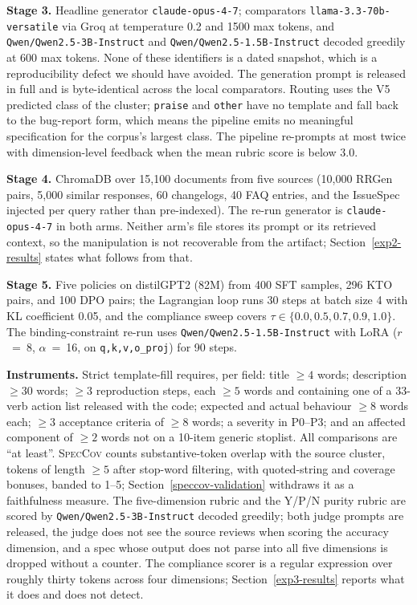 \documentclass[11pt]{article}
\begin{document}
  \textbf{Stage 3.} Headline generator \texttt{claude-opus-4-7}; comparators
  \texttt{llama-3.3-70b-versatile} via Groq at temperature 0.2 and 1500 max tokens, and
  \texttt{Qwen/Qwen2.5-3B-Instruct} and \texttt{Qwen/Qwen2.5-1.5B-Instruct} decoded greedily at
  600 max tokens. None of these identifiers is a dated snapshot, which is a reproducibility defect
  we should have avoided. The generation prompt is released in full and is byte-identical across
  the local comparators. Routing uses the V5 predicted class of the cluster; \texttt{praise} and
  \texttt{other} have no template and fall back to the bug-report form, which means the pipeline
  emits no meaningful specification for the corpus's largest class. The pipeline re-prompts at
  most twice with dimension-level feedback when the mean rubric score is below 3.0.

  \textbf{Stage 4.} ChromaDB over 15{,}100 documents from five sources (10{,}000 RRGen pairs,
  5{,}000 similar responses, 60 changelogs, 40 FAQ entries, and the IssueSpec injected per query
  rather than pre-indexed). The re-run generator is \texttt{claude-opus-4-7} in both arms. Neither
  arm's file stores its prompt or its retrieved context, so the manipulation is not recoverable
  from the artifact; Section~\ref{exp2-results} states what follows from that.

  \textbf{Stage 5.} Five policies on distilGPT2 (82M) from 400 SFT samples, 296 KTO pairs, and 100
  DPO pairs; the Lagrangian loop runs 30 steps at batch size 4 with KL coefficient 0.05, and the
  compliance sweep covers $\tau \in \{0.0, 0.5, 0.7, 0.9, 1.0\}$. The binding-constraint re-run
  uses \texttt{Qwen/Qwen2.5-1.5B-Instruct} with LoRA ($r$~=~8, $\alpha$~=~16, on
  \texttt{q,k,v,o\_proj}) for 90 steps.

  \textbf{Instruments.} Strict template-fill requires, per field: title $\geq 4$ words;
  description $\geq 30$ words; $\geq 3$ reproduction steps, each $\geq 5$ words and containing one
  of a 33-verb action list released with the code; expected and actual behaviour $\geq 8$ words
  each; $\geq 3$ acceptance criteria of $\geq 8$ words; a severity in P0--P3; and an affected
  component of $\geq 2$ words not on a 10-item generic stoplist. All comparisons are
  ``at least''. \textsc{SpecCov} counts substantive-token overlap with the source cluster, tokens
  of length $\geq 5$ after stop-word filtering, with quoted-string and coverage bonuses, banded to
  1--5; Section~\ref{speccov-validation} withdraws it as a faithfulness measure. The
  five-dimension rubric and the Y/P/N purity rubric are scored by
  \texttt{Qwen/Qwen2.5-3B-Instruct} decoded greedily; both judge prompts are released, the judge
  does not see the source reviews when scoring the accuracy dimension, and a spec whose output
  does not parse into all five dimensions is dropped without a counter. The compliance scorer is a
  regular expression over roughly thirty tokens across four dimensions; Section~\ref{exp3-results}
  reports what it does and does not detect.
\end{document}
